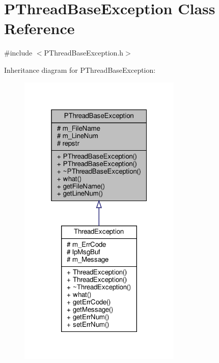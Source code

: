 \hypertarget{classPThreadBaseException}{}\section{P\+Thread\+Base\+Exception Class Reference}
\label{classPThreadBaseException}


{\ttfamily \#include $<$P\+Thread\+Base\+Exception.\+h$>$}



Inheritance diagram for P\+Thread\+Base\+Exception\+:\nopagebreak
\begin{figure}[H]
\begin{center}
\leavevmode
\includegraphics[width=220pt]{classPThreadBaseException__inherit__graph}
\end{center}
\end{figure}
